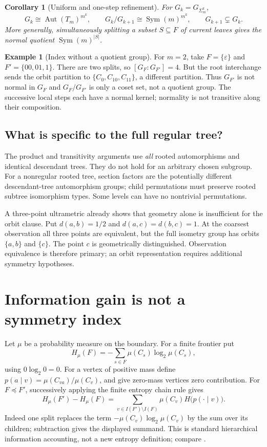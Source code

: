 \documentclass[11pt]{article}
\newtheorem{corollary}[theorem]{Corollary}
\theoremstyle{definition}
\newtheorem{example}[theorem]{Example}
\theoremstyle{remark}
\newcommand{\Aut}{\operatorname{Aut}}
\newcommand{\Sym}{\operatorname{Sym}}
\newcommand{\eps}{\varepsilon}
\begin{document}
\begin{corollary}[Uniform and one-step refinement]\label{cor:uniform}
For $G_k=G_{\Sigma_m^k}$,
\[
 G_k\cong\Aut(T_m)^{m^k},\qquad
 G_k/G_{k+1}\cong\Sym(m)^{m^k},\qquad G_{k+1}\subsetneq G_k.
\]
More generally, simultaneously splitting a subset $S\subseteq F$ of current leaves gives the normal quotient $\Sym(m)^{|S|}$.
\end{corollary}

\begin{example}[Index without a quotient group]\label{ex:nonnormal}
For $m=2$, take $F=\{\eps\}$ and $F'=\{00,01,1\}$. There are two splits, so $[G_F:G_{F'}]=4$. But the root interchange sends the orbit partition to $\{C_0,C_{10},C_{11}\}$, a different partition. Thus $G_{F'}$ is not normal in $G_F$ and $G_F/G_{F'}$ is only a coset set, not a quotient group. The successive local steps each have a normal kernel; normality is not transitive along their composition.
\end{example}

\subsection{What is specific to the full regular tree?}
The product and transitivity arguments use \emph{all} rooted automorphisms and identical descendant trees. They do not hold for an arbitrary chosen subgroup. For a nonregular rooted tree, section factors are the potentially different descendant-tree automorphism groups; child permutations must preserve rooted subtree isomorphism types. Some levels can have no nontrivial permutations.

A three-point ultrametric already shows that geometry alone is insufficient for the orbit clause. Put $d(a,b)=1/2$ and $d(a,c)=d(b,c)=1$. At the coarsest observation all three points are equivalent, but the full isometry group has orbits $\{a,b\}$ and $\{c\}$. The point $c$ is geometrically distinguished. Observation equivalence is therefore primary; an orbit representation requires additional symmetry hypotheses.

\section{Information gain is not a symmetry index}\label{sec:information}
Let $\mu$ be a probability measure on the boundary. For a finite frontier put
\[
H_\mu(F)=-\sum_{s\in F}\mu(C_s)\log_2\mu(C_s),
\]
using $0\log_2 0=0$. For a vertex of positive mass define $p(a\mid v)=\mu(C_{va})/\mu(C_v)$, and give zero-mass vertices zero contribution. For $F\preceq F'$, successively applying the finite entropy chain rule gives
\begin{equation}\label{eq:entropy}
 H_\mu(F')-H_\mu(F)
 =\sum_{v\in I(F')\setminus I(F)}\mu(C_v)H\bigl(p(\cdot\mid v)\bigr).
\end{equation}
Indeed one split replaces the term $-\mu(C_v)\log_2\mu(C_v)$ by the sum over its children; subtraction gives the displayed summand. This is standard hierarchical information accounting, not a new entropy definition; compare \cite[Equations (7) and (10)]{Perotti2020}.
\end{document}
